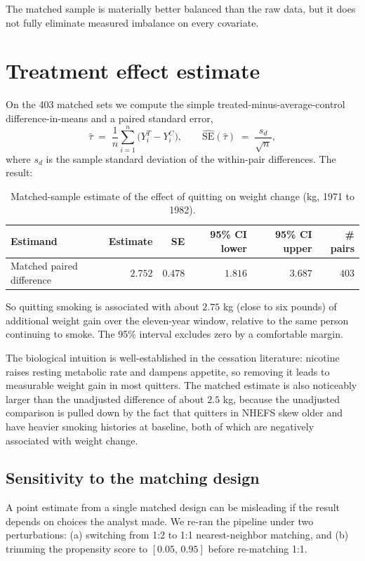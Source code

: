 \documentclass[11pt]{article}
\begin{document}
The matched sample is materially better balanced than the raw data, but it
does not fully eliminate measured imbalance on every covariate.

\section{Treatment effect estimate}

On the 403 matched sets we compute the simple treated-minus-average-control
difference-in-means and a paired standard error,
$$
\hat\tau \;=\; \frac{1}{n}\sum_{i=1}^{n}\bigl(Y_i^{T} - Y_i^{C}\bigr),
\qquad
\widehat{\mathrm{SE}}(\hat\tau) \;=\; \frac{s_d}{\sqrt{n}},
$$
where $s_d$ is the sample standard deviation of the within-pair
differences. The result:
\begin{table}[H]
\centering
\small
\begin{tabular}{@{}lrrrrr@{}}
\toprule
Estimand & Estimate & SE & 95\% CI lower & 95\% CI upper & \# pairs \\
\midrule
Matched paired difference & $2.752$ & $0.478$ & $1.816$ & $3.687$ & $403$ \\
\bottomrule
\end{tabular}
\caption{Matched-sample estimate of the effect of quitting on weight change
(kg, 1971 to 1982).}
\label{tab:ate}
\end{table}

So quitting smoking is associated with about $2.75$ kg (close to six
pounds) of additional weight gain over the eleven-year window, relative
to the same person continuing to smoke. The 95\% interval excludes zero
by a comfortable margin.

The biological intuition is well-established in the cessation literature:
nicotine raises resting metabolic rate and dampens appetite, so removing
it leads to measurable weight gain in most quitters. The matched estimate
is also noticeably larger than the unadjusted difference of about $2.5$
kg, because the unadjusted comparison is pulled down by the fact that
quitters in NHEFS skew older and have heavier smoking histories at
baseline, both of which are negatively associated with weight change.

\subsection{Sensitivity to the matching design}

A point estimate from a single matched design can be misleading if the
result depends on choices the analyst made. We re-ran the pipeline under
two perturbations: (a) switching from 1:2 to 1:1 nearest-neighbor matching,
and (b) trimming the propensity score to $[0.05,\,0.95]$ before re-matching
1:1.
\end{document}
